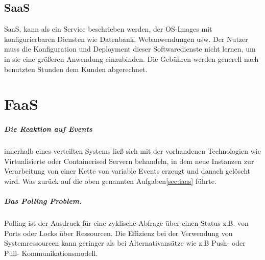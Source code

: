 \documentclass[
12pt,
english,
ngerman,
headsepline,
twoside,
openright,
numbers=noenddot,version=first
]{scrreprt}
\begin{document}
\section{SaaS} 
\label{sec:saas}
\acrfull{SaaS}, kann als ein Service beschrieben werden, der OS-Images mit konfigurierbaren Diensten wie Datenbank, Webanwendungen usw. Der Nutzer muss die Konfiguration und Deployment dieser Softwaredienste nicht lernen, um in sie eine größeren Anwendung einzubinden. Die Gebühren werden generell nach benutzten Stunden dem Kunden abgerechnet. 





\chapter{FaaS}%
 
\paragraph{Die Reaktion auf Events}\label{par:event-reaction} innerhalb eines verteilten Systems ließ sich mit der vorhandenen Technologien wie Virtualisierte oder Containerised Servern behandeln, in dem neue Instanzen zur Verarbeitung von einer Kette von variable Events erzeugt und danach gelöscht wird. Was zurück auf die oben genannten Aufgaben\ref{sec:iaas} führte.\cite{lambdaAWS}

\paragraph{Das Polling Problem.}\label{par:polling}
Polling ist der Ausdruck für eine zyklische Abfrage über einen Status z.B. von Ports oder Locks über Ressourcen. Die Effizienz bei der Verwendung von Systemressourcen kann geringer als bei Alternativansätze wie z.B Push- oder Pull- Kommunikationsmodell.\cite{lambdaAWS}
\end{document}
